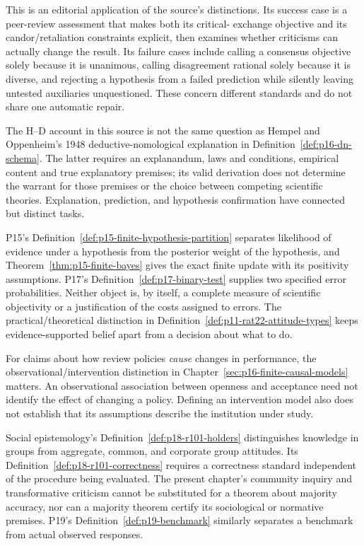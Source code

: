 This is an editorial application of the source's distinctions. Its
success case is a peer-review assessment that makes both its critical-
exchange objective and its candor/retaliation constraints explicit,
then examines whether criticisms can actually change the result.
Its failure cases include calling a consensus objective solely because
it is unanimous, calling disagreement rational solely because it is
diverse, and rejecting a hypothesis from a failed prediction while
silently leaving untested auxiliaries unquestioned. These concern
different standards and do not share one automatic repair.

The H--D account in this source is not the same question as Hempel
and Oppenheim's 1948 deductive-nomological explanation in
Definition~\ref{def:p16-dn-schema}. The latter requires an explanandum,
laws and conditions, empirical content and true explanatory premises;
its valid derivation does not determine the warrant for those premises
or the choice between competing scientific theories. Explanation,
prediction, and hypothesis confirmation have connected but distinct
tasks.

P15's Definition~\ref{def:p15-finite-hypothesis-partition} separates
likelihood of evidence under a hypothesis from the posterior weight
of the hypothesis, and Theorem~\ref{thm:p15-finite-bayes} gives the
exact finite update with its positivity assumptions. P17's
Definition~\ref{def:p17-binary-test} supplies two specified error
probabilities. Neither object is, by itself, a complete measure of
scientific objectivity or a justification of the costs assigned to
errors. The practical/theoretical distinction in
Definition~\ref{def:p11-rat22-attitude-types} keeps evidence-supported
belief apart from a decision about what to do.

For claims about how review policies \emph{cause} changes in performance,
the observational/intervention distinction in
Chapter~\ref{sec:p16-finite-causal-models} matters. An observational
association between openness and acceptance need not identify the
effect of changing a policy. Defining an intervention model also does
not establish that its assumptions describe the institution under study.

Social epistemology's
Definition~\ref{def:p18-r101-holders} distinguishes knowledge in
groups from aggregate, common, and corporate group attitudes.
Its Definition~\ref{def:p18-r101-correctness} requires a correctness
standard independent of the procedure being evaluated. The present
chapter's community inquiry and transformative criticism cannot be
substituted for a theorem about majority accuracy, nor can a majority
theorem certify its sociological or normative premises. P19's
Definition~\ref{def:p19-benchmark} similarly separates a benchmark
from actual observed responses.

